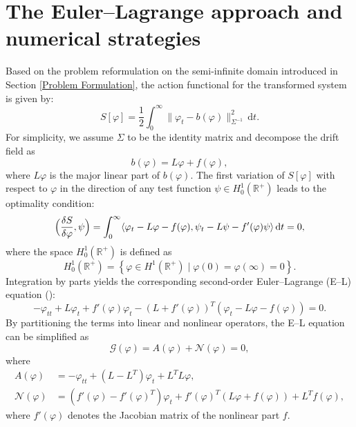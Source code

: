 \documentclass[a4paper,fleqn, 12pt]{cas-sc}
\newcommand{\diff}{\,\mathrm{d}}
\numberwithin{table}{section}
\begin{document}
\section{The Euler--Lagrange approach and numerical strategies}
\label{Numerical Strategies}
Based on the problem reformulation on the semi-infinite domain introduced in Section \ref{Problem Formulation}, the action functional for the transformed system is given by:
\begin{equation}
    \label{eq:MAMRp} S[\varphi] = \frac{1}{2} \int_0^{\infty} \|\varphi_t - b(\varphi)\|_{\Sigma^{-1}}^2 \diff t.
\end{equation}
For simplicity, we assume $\Sigma$ to be the identity matrix and decompose the drift field as 
\[b(\varphi) = L\varphi + f(\varphi),\]
where $L \varphi$ is the major linear part of $b (\varphi)$. The first variation of $S[\varphi]$ with respect to $\varphi$ in the direction of any test function $\psi \in H_0^1(\mathbb{R}^+)$ leads to the optimality condition:
\begin{equation}
    \label{var} \Bigl( \frac{\delta S}{\delta \varphi}, \psi \Bigr) = \int_0^{\infty} \langle \varphi_t - L\varphi - f(\varphi), \psi_t - L\psi - f'(\varphi)\psi \rangle \,\mathrm{d}t = 0,
\end{equation}
where the space $H_0^1(\mathbb{R}^+)$ is defined as \[H_0^1(\mathbb{R}^+) = \left\{ \varphi \in H^1(\mathbb{R}^+) \mid \varphi(0) = \varphi(\infty) = 0 \right\}.\]
Integration by parts yields the corresponding second-order Euler--Lagrange (E--L) equation (\cite{evans2022partial}):
\begin{equation}
    -\varphi_{tt} + L\varphi_t + f'(\varphi)\varphi_t - (L + f'(\varphi))^T \left(\varphi_t - L\varphi - f(\varphi)\right) = 0. \label{eq:EL1}
\end{equation}
By partitioning the terms into linear and nonlinear operators, the E--L equation can be simplified as 
\[
\mathcal{G}(\varphi) = {A}(\varphi) + \mathcal{N}(\varphi) = 0, 
\]
where
\begin{align}
    {A}(\varphi) &= -\varphi_{tt} + (L - L^T)\varphi_t + L^T L \varphi, \label{eq:linear_op} \\
    \mathcal{N}(\varphi) &= (f'(\varphi) - f'(\varphi)^T)\varphi_t + f'(\varphi)^T (L\varphi + f(\varphi)) + L^T f(\varphi), \label{eq:nonlinear_op}
\end{align}
where $f'(\varphi)$ denotes the Jacobian matrix of the nonlinear part $f$.
\end{document}
